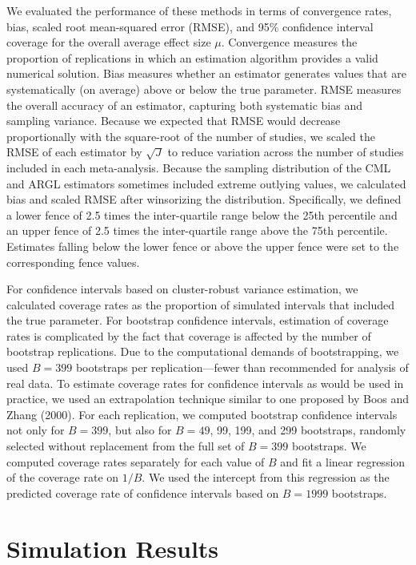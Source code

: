 \documentclass[
  american,
  man, donotrepeattitle,floatsintext]{apa7}
\begin{document}
We evaluated the performance of these methods in terms of convergence rates, bias,
scaled root mean-squared error (RMSE), and 95\% confidence interval coverage for the overall average effect size \(\mu\).
Convergence measures the proportion of replications in which an estimation algorithm provides a valid numerical solution.
Bias measures whether an estimator generates values that are systematically (on average) above or below the true parameter.
RMSE measures the overall accuracy of an estimator, capturing both systematic bias and sampling variance.
Because we expected that RMSE would decrease proportionally with the square-root of the number of studies, we scaled the RMSE of each estimator by \(\sqrt{J}\) to reduce variation across the number of studies included in each meta-analysis.
Because the sampling distribution of the CML and ARGL estimators sometimes included extreme outlying values, we calculated bias and scaled RMSE after winsorizing the distribution.
Specifically, we defined a lower fence of 2.5 times the inter-quartile range below the 25th percentile and an upper fence of 2.5 times the inter-quartile range above the 75th percentile.
Estimates falling below the lower fence or above the upper fence were set to the corresponding fence values.

For confidence intervals based on cluster-robust variance estimation, we calculated coverage rates as the proportion of simulated intervals that included the true parameter.
For bootstrap confidence intervals, estimation of coverage rates is complicated by the fact that coverage is affected by the number of bootstrap replications.
Due to the computational demands of bootstrapping, we used \(B = 399\) bootstraps per replication---fewer than recommended for analysis of real data.
To estimate coverage rates for confidence intervals as would be used in practice, we used an extrapolation technique similar to one proposed by Boos and Zhang (2000).
For each replication, we computed bootstrap confidence intervals not only for \(B = 399\), but also for \(B = 49\), 99, 199, and 299 bootstraps, randomly selected without replacement from the full set of \(B = 399\) bootstraps.
We computed coverage rates separately for each value of \(B\) and fit a linear regression of the coverage rate on \(1 / B\).
We used the intercept from this regression as the predicted coverage rate of confidence intervals based on \(B = 1999\) bootstraps.

\section{Simulation Results}\label{simulation-results}
\end{document}
